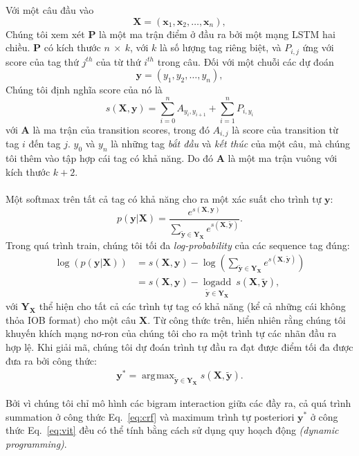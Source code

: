 \documentclass[11pt,letterpaper]{article}
\DeclareMathOperator{\logadd}{logadd}
\DeclareMathOperator*{\argmax}{\arg\!\max}
\begin{document}
Với một câu đầu vào
$$\mathbf{X} = (\mathbf{x}_1, \mathbf{x}_2, \ldots, \mathbf{x}_n),$$
Chúng tôi xem xét $\mathbf{P}$ là một ma trận điểm ở đầu ra bởi một mạng LSTM hai chiều. $\mathbf{P}$ có kích thước $n~\times~k$, với $k$ là số lượng tag riêng biệt, và $P_{i, j}$ ứng với score của tag thứ $j^{th}$ của từ thứ $i^{th}$ trong câu. Đối với một chuỗi các dự đoán
$$\mathbf{y} = (y_1, y_2, \ldots, y_n),$$
Chúng tôi định nghĩa score của nó là
$$s(\mathbf{X}, \mathbf{y})=\sum_{i=0}^{n} A_{y_i, y_{i+1}} + \sum_{i=1}^{n} P_{i, y_i}$$
với $\mathbf{A}$ là ma trận của transition scores, trong đó $A_{i, j}$ là score của transition từ tag $i$ đến tag $j$. $y_0$ và $y_n$ là những tag \textit{bắt đầu} và \textit{kết thúc} của một câu, mà chúng tôi thêm vào tập hợp cái tag có khả năng. 
Do đó $\mathbf{A}$ là một ma trận vuông với kích thước $k+2$.
\\
\\
Một softmax trên tất cả tag có khả năng cho ra một xác suất cho trình tự $\mathbf{y}$:
$$p(\mathbf{y} | \mathbf{X}) = \frac{
	e^{s(\mathbf{X}, \mathbf{y})}
}{
	\sum_{\mathbf{\widetilde{y}} \in \mathbf{Y_X}} e^{s(\mathbf{X}, \mathbf{\widetilde{y}})}
}.$$
Trong quá trình train, chúng tôi tối đa \textit{log-probability} của các sequence tag đúng:
\\
\begin{align}
\log(p(\mathbf{y} | \mathbf{X})) &= s(\mathbf{X}, \mathbf{y}) - \log \left( \sum_{\mathbf{\widetilde{y}} \in \mathbf{Y_X}} e^{s(\mathbf{X}, \mathbf{\widetilde{y}})} \right) \nonumber \\
&= s(\mathbf{X}, \mathbf{y}) - \underset{{\mathbf{\widetilde{y}} \in \mathbf{Y_X}}}{\logadd}\ s(\mathbf{X}, \mathbf{\widetilde{y}}), \label{eq:crf}
\end{align}
với $\mathbf{Y_X}$ thể hiện cho tất cả các trình tự tag có khả năng (kể cả những cái không thỏa IOB format) cho một câu $\mathbf{X}$. Từ công thức trên, hiển nhiên rằng chúng tôi khuyến khích mạng nơ-ron của chúng tôi cho ra một trình tự các nhãn đầu ra hợp lệ. 
Khi giải mã, chúng tôi dự đoán trình tự đầu ra đạt được điểm tối đa được đưa ra bởi công thức:
\begin{align}
\mathbf{y}^* = \argmax_{\mathbf{\widetilde{y}} \in \mathbf{Y_X}}{s(\mathbf{X}, \mathbf{\widetilde{y}})}. \label{eq:vit}
\end{align}

Bởi vì chúng tôi chỉ mô hình các bigram interaction giữa các đầy ra, cả quá trình summation ở công thức Eq.~\ref{eq:crf} và maximum trình tự posteriori $\mathbf{y}^*$ ở công thức Eq.~\ref{eq:vit} đều có thể tính bằng cách sử dụng quy hoạch động \textit{(dynamic programming)}.
\end{document}
